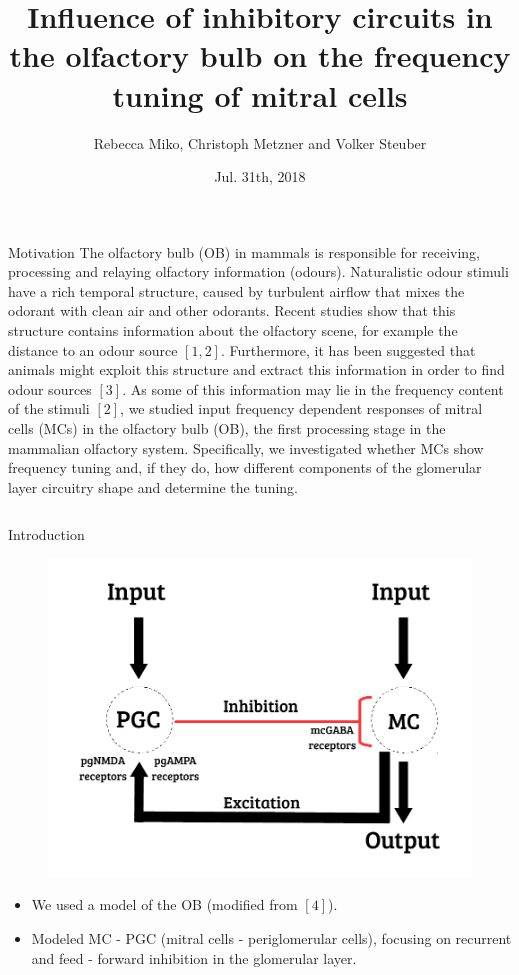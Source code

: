 \documentclass[final,hyperref={pdfpagelabels=false}]{beamer}
\title{Influence of inhibitory circuits in the olfactory bulb on the frequency tuning of mitral cells}
\author[Miko]{Rebecca Miko, Christoph Metzner and Volker Steuber}
\institute{University of Hertfordshire, AL10 9AB, UK}
\date{Jul. 31th, 2018}
\begin{document}
\begin{frame}{} 
  \begin{block}{Motivation}
    The olfactory bulb (OB) in mammals is responsible for receiving, processing and relaying olfactory information (odours). 
    Naturalistic odour stimuli have a rich temporal structure, caused by turbulent airflow that mixes the odorant with clean air and other odorants. 
    Recent studies show that this structure contains information about the olfactory scene, for example the distance to an odour source $[1,2]$. 
    Furthermore, it has been suggested that animals might exploit this structure and extract this information in order to find odour sources $[3]$. 
    As some of this information may lie in the frequency content of the stimuli $[2]$, we studied input frequency dependent responses of mitral cells (MCs) in the olfactory bulb (OB), the first processing stage in the mammalian olfactory system.
    Specifically, we investigated whether MCs show frequency tuning and, if they do, how different components of the glomerular layer circuitry shape and determine the tuning.
  \end{block}
  
  

  \begin{columns}[t]
    \begin{column}{.48\linewidth}
    
      \begin{block}{Introduction} 
      	\begin{figure}
      		\center
      		\includegraphics[scale=0.6]{images/Circuit_Diagram}
      		\end{figure}
      		\begin{itemize}
      			\item We used a model of the OB (modified from $[4]$).
      			\item Modeled MC - PGC (mitral cells - periglomerular cells), focusing on recurrent and feed - forward inhibition in the glomerular layer.
      		\end{itemize}
      \end{block}
      

\end{column}
\end{columns}
\end{frame}
\end{document}
